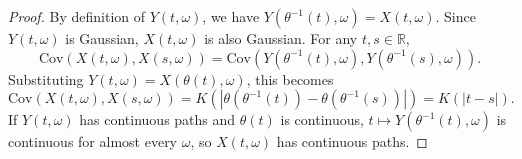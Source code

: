 \documentclass{mc}
\begin{document}
\begin{proof}
By definition of \(Y(t, \omega)\), we have \(Y(\theta^{-1}(t), \omega) = X(t, \omega)\). Since \(Y(t, \omega)\) is Gaussian, \(X(t, \omega)\) is also Gaussian. For any \(t, s \in \mathbb{R}\),
\[
\mathrm{Cov}(X(t, \omega), X(s, \omega)) = \mathrm{Cov}(Y(\theta^{-1}(t), \omega), Y(\theta^{-1}(s), \omega)).
\]
Substituting \(Y(t, \omega) = X(\theta(t), \omega)\), this becomes
\[
\mathrm{Cov}(X(t, \omega), X(s, \omega)) = K(|\theta(\theta^{-1}(t)) - \theta(\theta^{-1}(s))|) = K(|t - s|).
\]
If \(Y(t, \omega)\) has continuous paths and \(\theta(t)\) is continuous, \(t \mapsto Y(\theta^{-1}(t), \omega)\) is continuous for almost every \(\omega\), so \(X(t, \omega)\) has continuous paths.
\end{proof}




\end{document}
